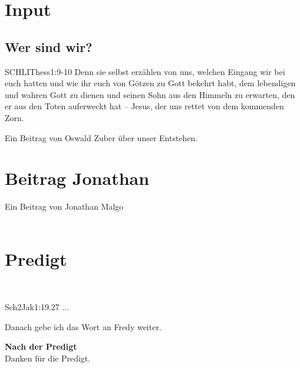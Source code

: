 \documentclass{../inc/mybib}
\begin{document}

\section{ Input }
\begin{spacing}{1.5}
\subsection{Wer sind wir?}
\begin{bibelbox}{SCHL}{IThess}{1:9-10}
Denn sie selbst erzählen von uns, welchen Eingang wir bei euch hatten und wie ihr euch von Götzen zu Gott bekehrt habt, dem lebendigen und wahren Gott zu dienen und seinen Sohn aus den Himmeln zu erwarten, den er aus den Toten auferweckt hat -- Jesus, der uns rettet von dem kommenden Zorn.
\end{bibelbox}

Ein Beitrag von Oswald Zuber über unser Entstehen.
\end{spacing}


\section{Beitrag Jonathan}
Ein Beitrag von Jonathan Malgo\\

\\

\section{Predigt}
\\
\begin{bibeltext}{Sch2}{Jak}{1:19.27}
...
\end{bibeltext}
Danach gebe ich das Wort an Fredy weiter.

\textbf{Nach der Predigt}\\

Danken für die Predigt.\\

\\
\end{document}
